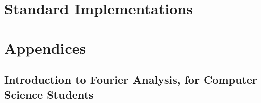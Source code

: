 \documentclass{book}
\newcommand{\LoadSection}[1]{{}}
\newcommand{\LoadAppendix}[1]{{}}
\begin{document}
\newpage
\chapter{Standard Implementations}
\label{cha:standard-implementations}

    \LoadSection{standard-implementations/javascript/intro}
    \newpage
    \LoadSection{standard-implementations/javascript/max-heap-implementation}
    \newpage
    \LoadSection{standard-implementations/python}

\appendix
\chapter{Appendices}

\section{Introduction to Fourier Analysis, for Computer Science Students}
\label{sec:appendix--fourier}

    \LoadAppendix{intro-to-fourier-analysis/background}

%
\end{document}
